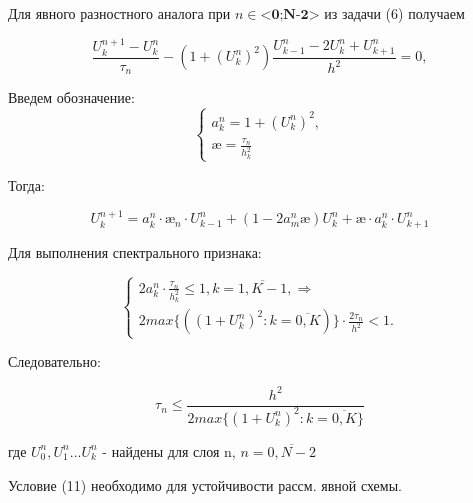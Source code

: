 \documentclass[__main__.tex]{subfiles}
\begin{document}
Для явного разностного аналога при $n \in \textbf{<0;N-2>}$ из задачи (6) получаем 

\begin{equation} \label{42.7}
\frac{U^{n+1}_k - U^{n}_k}{\tau_n} - (1 + (U^n_k)^2)\frac{U^{n}_{k-1} - 2U^{n}_k + U^n_{k+1}}{h^2} = 0,
\end{equation} 

Введем обозначение:
 \begin{equation} \label{42.8}
 \begin{cases}
 a^n_k = 1 + (U^n_k)^2, \\
 \text{\ae} = \frac{\tau_n}{h^2_k}
 \end{cases}
 \end{equation} 
 
Тогда:

 \begin{equation} \label{42.9}
U^{n+1}_k = a^n_k \cdot \text{\ae}_n \cdot U^n_{k-1} + (1 - 2a^n_m \text{\ae})U^n_k + \text{\ae} \cdot a^n_k \cdot U^n_{k+1}
\end{equation} 
 
 Для выполнения спектрального признака:
 
 \begin{equation} \label{42.10}
 \begin{cases}
  2a^n_k \cdot \frac{\tau_n}{h^2_k} \leq 1, k = \overline{1,K-1}, \Rightarrow \\
  2max \{((1 + U^n_k)^2:  k = \overline{0,K})\} \cdot \frac{2\tau_n}{h^2} < 1.
  \end{cases}
 \end{equation} 
 
 Следовательно:
 
 \begin{equation} \label{42.11}
 \tau_n \leq \frac{h^2}{2max \{(1 + U^n_k)^2:  k = \overline{0,K}\}}
 \end{equation} 
 
 где $U^n_0, U^n_1 ... U^n_k$ - найдены для слоя n, $n = \overline{0,N-2}$
 
 Условие (11) необходимо для устойчивости рассм. явной схемы.
 
\end{document}
